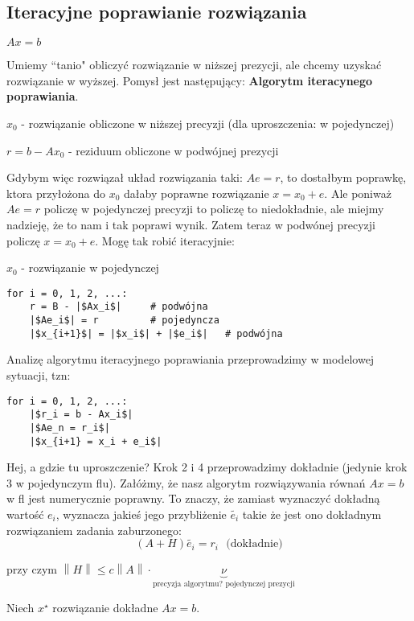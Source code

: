 \documentclass[hidelinks,a4paper,fleqn,oneside]{book}
\newcommand{\norm}[1]{\left\lVert#1\right\rVert}
\begin{document}
\subsection{Iteracyjne poprawianie rozwiązania}

$Ax = b$

Umiemy ``tanio" obliczyć rozwiązanie w niższej prezycji, ale chcemy uzyskać rozwiązanie w wyższej. Pomysł jest następujący: \textbf{Algorytm iteracynego poprawiania}.

$x_0$ - rozwiązanie obliczone w niższej precyzji (dla uproszczenia: w pojedynczej)

$r = b-Ax_0$ - reziduum obliczone w podwójnej prezycji

Gdybym więc rozwiązał układ rozwiązania taki: $Ae = r$, to dostałbym poprawkę, ktora przyłożona do $x_0$ dałaby poprawne rozwiązanie $x = x_0 + e$. Ale poniważ $Ae = r$ policzę w pojedynczej precyzji to policzę to niedokładnie, ale miejmy nadzieję, że to nam i tak poprawi wynik. Zatem teraz w podwónej precyzji policzę $x = x_0 + e$. Mogę tak robić iteracyjnie:

$x_0$ - rozwiązanie w pojedynczej
\begin{verbatim}
for i = 0, 1, 2, ...:
    r = B - |$Ax_i$|     # podwójna
    |$Ae_i$| = r         # pojedyncza
    |$x_{i+1}$| = |$x_i$| + |$e_i$|   # podwójna
\end{verbatim}


Analizę algorytmu iteracyjnego poprawiania przeprowadzimy w modelowej sytuacji, tzn:
\begin{verbatim}
for i = 0, 1, 2, ...:
    |$r_i = b - Ax_i$|
    |$Ae_n = r_i$|
    |$x_{i+1} = x_i + e_i$|
\end{verbatim}
Hej, a gdzie tu uproszczenie? Krok 2 i 4 przeprowadzimy dokładnie (jedynie krok 3 w pojedynczym flu). Załóżmy, że nasz algorytm rozwiązywania równań $Ax = b$ w fl jest numerycznie poprawny. To znaczy, że zamiast wyznaczyć dokładną wartość $e_i$, wyznacza jakieś jego przybliżenie $\tilde{e_i}$ takie że jest ono dokładnym rozwiązaniem zadania zaburzonego:
\[
	(A + H)\tilde{e_i} = r_i \ \ \ \textrm{(dokładnie)}
\]

przy czym $\norm{H} \leq c \norm{A} \cdot \underbrace{\nu}_{\textrm{precyzja algorytmu? pojedynczej prezycji}}$

Niech $x^\star$ rozwiązanie dokładne $Ax = b$.
\end{document}
